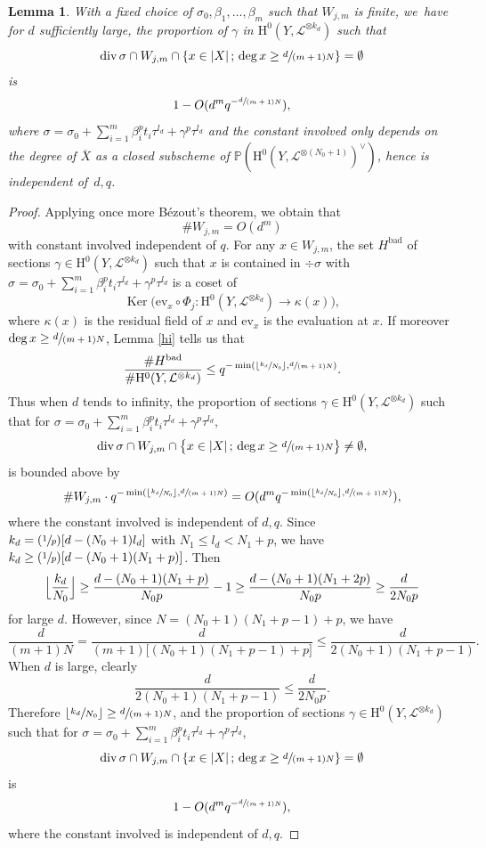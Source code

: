 \documentclass[11pt]{article}
\numberwithin{equation}{section}
\newcommand{\Psfrac}[2]{(\sfrac{#1}{#2})}
\newcommand{\sep}{\,;\,}
\theoremstyle{plain}
\newtheorem{lem}[thm]{Lemma}
\theoremstyle{definition}
\newcommand{\ho}{\mathrm{H}}
\newcommand{\li}{\mathcal{L}}
\newcommand{\pr}{\mathbb{P}}
\DeclareMathOperator{\Ker}{Ker}
\begin{document}
\begin{lem}\label{finiteset}
With a fixed choice of $\sigma_0, \beta_1,\dots, \beta_m$ such that $W_{j,m}$ is finite, we~have for $d$ sufficiently large, the proportion of $\gamma $ in $\ho^0(Y,\mathcal{L}^{\otimes k_d})$ such that
\[
\div \sigma\cap W_{j,m}\cap \left\{ x\in |X|\sep \deg x\geq\sfrac{d}{(m+1)N} \right\}=\emptyset
\]
is
\[
1-O(d^m q^{-\sfrac{d}{(m+1)N}}),
\]
where $\sigma=\sigma_0+\sum_{i=1}^{m} \beta_i^pt_i\tau^{l_d}+\gamma^p\tau^{l_d}$ and the constant involved only depends on the degree of $\overline{X}$ as a closed subscheme of $\pr(\ho^0(Y, \li^{\otimes (N_0+1)})^{\vee})$, hence is independent of~$d,q$.
\end{lem}
\begin{proof}[Proof]
Applying once more Bézout's theorem, we obtain that
\[
\#W_{j,m}=O(d^m)
\]
with constant involved independent of $q$. For any $x\in W_{j,m}$, the set $H^{\mathrm{bad}}$ of sections $\gamma\in \ho^0(Y, \li^{\otimes k_d})$ such that $x$ is contained in $\div \sigma$ with $\sigma=\sigma_0+\sum_{i=1}^{m} \beta_i^pt_i\tau^{l_d}+\gamma^p\tau^{l_d}$ is a coset of
\[
\Ker \bigl(\mathrm{ev}_x\circ \Phi_j: \ho^0(Y, \mathcal{L}^{\otimes k_d})\to \kappa(x) \bigr),
\]
where $\kappa(x)$ is the residual field of $x$ and $\mathrm{ev}_x$ is the evaluation at $x$. If moreover $\deg x\geq\sfrac{d}{(m+1)N}$, Lemma \ref{hi} tells us that
\[
\frac{\#H^{\mathrm{bad}}}{\#\ho^0(Y, \li^{\otimes k_d})} \leq q^{-\min(\lfloor\sfrac{k_d}{N_0}\rfloor, \sfrac{d}{(m+1)N})}.
\]
Thus when $d$ tends to infinity, the proportion of sections $\gamma \in \ho^0(Y, \li^{\otimes k_d})$ such that for $\sigma=\sigma_0+\sum_{i=1}^{m} \beta_i^pt_i\tau^{l_d}+\gamma^p\tau^{l_d}$,
\[
\div \sigma\cap W_{j,m}\cap \bigl\{ x\in |X|\sep \deg x\geq\sfrac{d}{(m+1)N} \bigr\}\not=\emptyset,
\]
is bounded above by
\[
\#W_{j,m}\cdot q^{-\min(\lfloor\sfrac{k_d}{N_0}\rfloor, \sfrac{d}{(m+1)N})}= O(d^m q^{-\min(\lfloor\sfrac{k_d}{N_0}\rfloor, \sfrac{d}{(m+1)N})}),
\]
where the constant involved is independent of $d,q$. Since $k_d=\Psfrac{1}{p}[d-(N_0+1)l_d]$ with $N_1\leq l_d< N_1+p$, we have $k_d\geq \Psfrac{1}{p}[d-(N_0+1)(N_1+p)]$. Then
\[
\Bigl\lfloor\frac{k_d}{N_0}\Bigr\rfloor\geq \frac{d-(N_0+1)(N_1+p)}{N_0 p}-1\geq \frac{d-(N_0+1)(N_1+2p)}{N_0 p}\geq \frac{d}{2N_0p}
\]
for large $d$. However, since $N= (N_0+1)(N_1+p-1)+p$, we have
\[
\frac{d}{(m+1)N}= \frac{d}{(m+1)\big[(N_0+1)(N_1+p-1)+p\big]}\leq \frac{d}{2(N_0+1)(N_1+p-1)}.
\]
When $d$ is large, clearly
\[
\frac{d}{2(N_0+1)(N_1+p-1)}\leq \frac{d}{2N_0p}.
\]
Therefore $\lfloor\sfrac{k_d}{N_0}\rfloor\geq \sfrac{d}{(m+1)N}$, and the proportion of sections $\gamma \in \ho^0(Y, \li^{\otimes k_d})$ such that for $\sigma=\sigma_0+\sum_{i=1}^{m} \beta_i^pt_i\tau^{l_d}+\gamma^p\tau^{l_d}$,
\[
\div \sigma\cap W_{j,m}\cap \{ x\in |X|\sep \deg x\geq\sfrac{d}{(m+1)N} \}=\emptyset
\]
is
\[
1-O(d^m q^{-\sfrac{d}{(m+1)N}}),
\]
where the constant involved is independent of $d,q$.
\end{proof}
\end{document}
